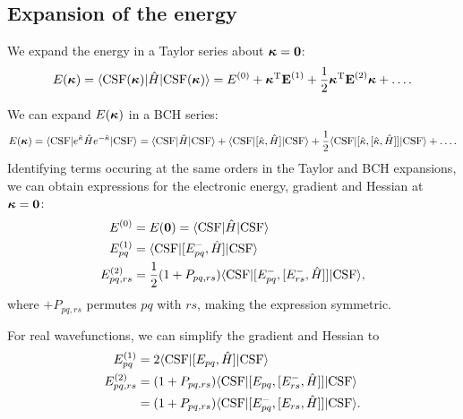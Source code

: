 \documentclass{article}
\begin{document}
\subsection{Expansion of the energy}
We expand the energy in a Taylor series about $\bm{\mathrm{\kappa}}=\bm{\mathrm{0}}$:
\begin{equation}
E(\bm{\mathrm{\kappa}})=\langle\mathrm{CSF}(\bm{\mathrm{\kappa}})|\hat{H}|\mathrm{CSF}(\bm{\mathrm{\kappa}})\rangle=E^{(0)}+\bm{\mathrm{\kappa}}^{\mathrm{T}}\bm{\mathrm{E}}^{(1)}+\frac{1}{2}\bm{\mathrm{\kappa}}^{\mathrm{T}}\bm{\mathrm{E}}^{(2)}\bm{\mathrm{\kappa}}+\dots.
\end{equation}

We can expand $E(\bm{\mathrm{\kappa}})$ in a BCH series:
\begin{equation}
E(\bm{\mathrm{\kappa}})=\langle\mathrm{CSF} | e^{\hat{\kappa}}\hat{H}e^{-\hat{\kappa}} |\mathrm{CSF} \rangle =\langle\mathrm{CSF}|\hat{H}|\mathrm{CSF}\rangle+\langle\mathrm{CSF}|[\hat{\kappa},\hat{H}]|\mathrm{CSF}\rangle+\frac{1}{2}\langle\mathrm{CSF}|[\hat{\kappa},[\hat{\kappa},\hat{H}]]|\mathrm{CSF}\rangle+\dots.
\end{equation}
Identifying terms occuring at the same orders in the Taylor and BCH expansions, we can obtain expressions for the electronic energy, gradient and Hessian at $\bm{\mathrm{\kappa}}=\bm{\mathrm{0}}$:
\begin{align}
E^{(0)}&=E(\bm{\mathrm{0}})=\langle\mathrm{CSF}|\hat{H}|\mathrm{CSF}\rangle\\
E^{(1)}_{pq}&=\langle\mathrm{CSF}|[E_{pq}^-,\hat{H}]|\mathrm{CSF}\rangle\\
E^{(2)}_{pq,rs}&=\frac{1}{2}(1+P_{pq,rs})\langle\mathrm{CSF}|[E_{pq}^-,[E_{rs}^-,\hat{H}]]|\mathrm{CSF}\rangle,
\end{align}
where $+P_{pq,rs}$ permutes $pq$ with $rs$, making the expression symmetric.

For real wavefunctions, we can simplify the gradient and Hessian to
\begin{align}
E^{(1)}_{pq}&=2\langle\mathrm{CSF}|[E_{pq},\hat{H}]|\mathrm{CSF}\rangle\\
E^{(2)}_{pq,rs}&=(1+P_{pq,rs})\langle\mathrm{CSF}|[E_{pq},[E_{rs}^-,\hat{H}]]|\mathrm{CSF}\rangle\\
&=(1+P_{pq,rs})\langle\mathrm{CSF}|[E_{pq}^-,[E_{rs},\hat{H}]]|\mathrm{CSF}\rangle.
\end{align}
\end{document}
